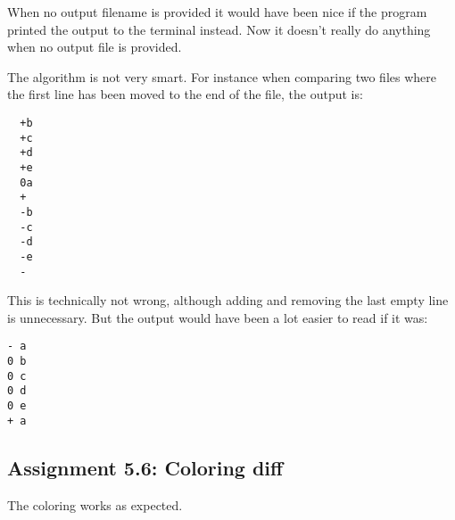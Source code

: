 \documentclass[a4paper]{article}
\begin{document}
When no output filename is provided it would have been nice if the program printed the output to the terminal instead. Now it doesn't really do anything when no output file is provided.

The algorithm is not very smart. For instance when comparing two files where the first line has been moved to the end of the file, the output is:

\begin{verbatim}
  +b
  +c
  +d
  +e
  0a
  +
  -b
  -c
  -d
  -e
  -
\end{verbatim}

This is technically not wrong, although adding and removing the last empty line is unnecessary. But the output would have been a lot easier to read if it was:

\begin{verbatim}
- a
0 b
0 c
0 d
0 e
+ a
\end{verbatim}



\subsection*{Assignment 5.6:  Coloring diff}
The coloring works as expected. 



\end{document}
